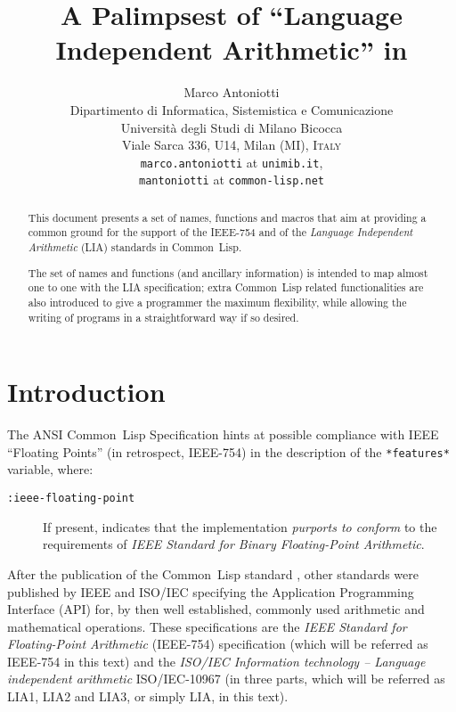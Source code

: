 \documentclass[10pt,fleqn]{article}
\title{
\LARGE{\bfseries A Palimpsest of ``Language Independent Arithmetic'' in \CL{}}}
\author{
  Marco Antoniotti\\
  Dipartimento di Informatica, Sistemistica e Comunicazione\\
  Universit\`{a} degli Studi di Milano Bicocca\\
  Viale Sarca 336, U14, Milan (MI), \textsc{Italy}\\[2mm]
  \texttt{marco.antoniotti} at \texttt{unimib.it},\\
  \texttt{mantoniotti} at \texttt{common-lisp.net}}
\newcommand{\CL}{\textsf{Common~Lisp}}
\newcommand{\code}[1]{\texttt{#1}}
\newcommand{\IEEEFPStd}{IEEE-754}
\newcommand{\IECLIA}{ISO/IEC-10967}
\begin{document}
\maketitle


\begin{abstract}
  This document presents a set of names, functions and macros that aim
  at providing a common ground for the support of the \IEEEFPStd{}
  \cite{2008:IEEE-754} and of the \emph{Language Independent
    Arithmetic} (LIA) standards \cite{2012:LIA1,2001:LIA2,2004:LIA3}
  in \CL{}.

  The set of names and functions (and ancillary information) is
  intended to map almost one to one with the LIA specification; extra
  \CL{} related functionalities are also introduced to give a
  programmer the maximum flexibility, while allowing the writing of
  programs in a straightforward way if so desired.
\end{abstract}

\newpage

\tableofcontents

\newpage

\section{Introduction}

The ANSI \CL{} Specification \cite{1996:ANSIHyperSpec} hints at possible
compliance with IEEE ``Floating Points'' (in retrospect, \IEEEFPStd{}) in
the description of the \code{*features*} variable, where:
\begin{description}
\item[\code{:ieee-floating-point}]
  If present, indicates that the
  implementation \emph{purports to conform}  to the requirements of
  \emph{IEEE Standard for Binary Floating-Point Arithmetic}. 
\end{description}

After the publication of the \CL{} standard \cite{1994:ANSICL}, other
standards were published by IEEE and ISO/IEC specifying the
Application Programming Interface (API) for, by then well established,
commonly used arithmetic and mathematical operations.  These
specifications are the \emph{IEEE Standard for Floating-Point
  Arithmetic} (\IEEEFPStd{}) \cite{2008:IEEE-754} specification (which
will be referred as \IEEEFPStd{} in this text) and the \emph{ISO/IEC
  Information technology -- Language independent arithmetic} \IECLIA{}
\cite{2012:LIA1,2001:LIA2,2004:LIA3} (in three parts, which will be
referred as LIA1, LIA2 and LIA3, or simply LIA, in this text).
\end{document}
